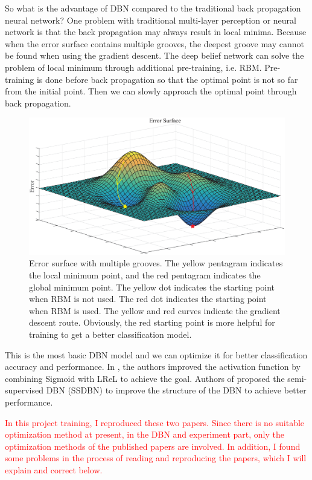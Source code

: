 \documentclass{bioinfo}
\begin{document}
So what is the advantage of DBN compared to the traditional back propagation neural network? One problem with traditional multi-layer perception or neural network is that the back propagation may always result in local minima. Because when the error surface contains multiple grooves, the deepest groove may cannot be found when using the gradient descent. The deep belief network can solve the problem of local minimum through additional pre-training, i.e. RBM. Pre-training is done before back propagation so that the optimal point is not so far from the initial point. Then we can slowly approach the optimal point through back propagation.

\begin{figure}[htbp]
	\centering
	\includegraphics[width=\columnwidth]{surface.eps}
	\caption{Error surface with multiple grooves. The yellow pentagram indicates the local minimum point, and the red pentagram indicates the global minimum point. The yellow dot indicates the starting point when RBM is not used. The red dot indicates the starting point when RBM is used. The yellow and red curves indicate the gradient descent route. Obviously, the red starting point is more helpful for training to get a better classification model.}
	\label{fig:surface}
\end{figure}

This is the most basic DBN model and we can optimize it for better classification accuracy and performance. In \cite{YiThe}, the authors improved the activation function by combining Sigmoid with LReL to achieve the goal. Authors of \cite{wang2017improved} proposed the semi-supervised DBN (SSDBN) to improve the structure of the DBN to achieve better performance.

\textcolor{red}{In this project training, I reproduced these two papers. Since there is no suitable optimization method at present, in the DBN and experiment part, only the optimization methods of the published papers are involved. In addition, I found some problems in the process of reading and reproducing the papers, which I will explain and correct below.}
\end{document}
